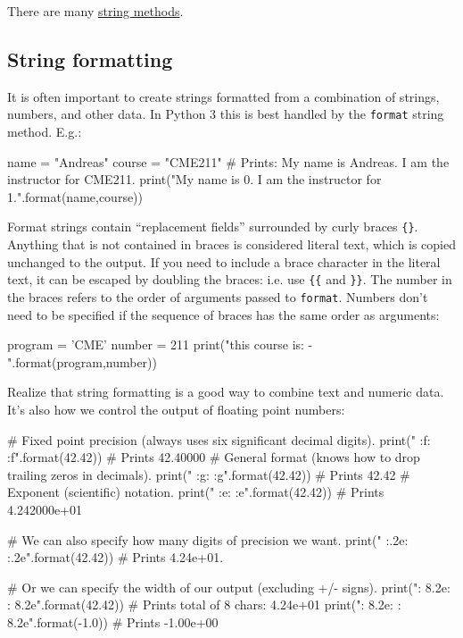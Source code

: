 \documentclass[12pt]{article} \newif\ifsolution\solutiontrue %
\begin{document}
There are many \href{https://docs.python.org/3/library/stdtypes.html#string-methods}{string methods}.

\subsection{String formatting}

It is often important to create strings formatted from a combination of strings,
numbers, and other data.  In Python 3 this is best handled by the \texttt{format}
string method.  E.g.:

\begin{python}
name = "Andreas"
course = "CME211"
# Prints: My name is Andreas. I am the instructor for CME211.
print("My name is {0}. I am the instructor for {1}.".format(name,course))
\end{python}

Format strings contain ``replacement fields'' surrounded by curly braces \texttt{\{\}}.
Anything that is not contained in braces is considered literal text, which is
copied unchanged to the output. If you need to include a brace character in the
literal text, it can be escaped by doubling the braces: i.e. use  \texttt{\{\{} and \texttt{\}\}}.  The number in the
braces refers to the order of arguments passed to \texttt{format}.  Numbers don't need
to be specified if the sequence of braces has the same order as arguments:

\begin{python}
program = 'CME'
number = 211
print("this course is: {}-{}".format(program,number))
\end{python}

Realize that string formatting is a good way to combine text and numeric data. It's also how we control the output of floating point numbers:

\begin{python}
# Fixed point precision (always uses six significant decimal digits).
print("    {{:f}}: {:f}".format(42.42))  # Prints 42.40000
# General format (knows how to drop trailing zeros in decimals).
print("    {{:g}}: {:g}".format(42.42))  # Prints 42.42
# Exponent (scientific) notation.
print("    {{:e}}: {:e}".format(42.42))  # Prints 4.242000e+01

# We can also specify how many digits of precision we want.
print("  {{:.2e}}: {:.2e}".format(42.42))    # Prints 4.24e+01.

# Or we can specify the width of our output (excluding +/- signs).
print("{{: 8.2e}}: {: 8.2e}".format(42.42))  # Prints total of 8 chars: 4.24e+01
print("{{: 8.2e}}: {: 8.2e}".format(-1.0))   # Prints -1.00e+00
\end{python}
\end{document}
